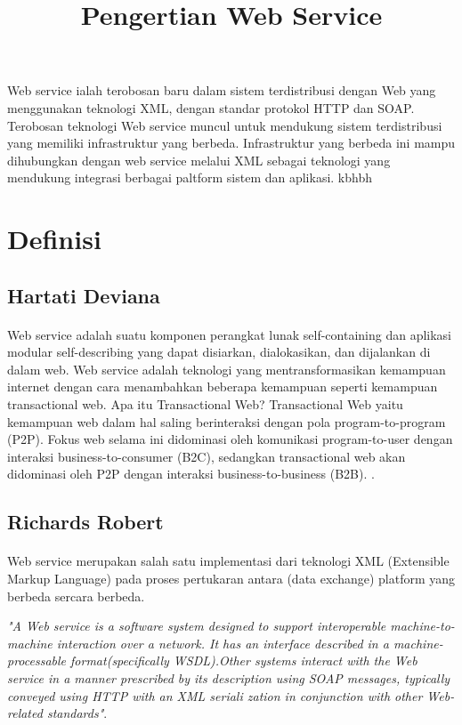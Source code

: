 \documentclass[12pt]{article}
\begin{document}
\title{Pengertian Web Service}
\maketitle

Web service ialah terobosan baru dalam sistem terdistribusi dengan Web yang menggunakan teknologi XML, dengan standar protokol  HTTP dan SOAP. Terobosan teknologi Web service muncul untuk mendukung sistem terdistribusi yang memiliki infrastruktur yang berbeda. Infrastruktur yang berbeda ini mampu dihubungkan dengan web service melalui XML sebagai teknologi yang mendukung integrasi berbagai paltform sistem dan aplikasi.
kbhbh
\section{Definisi}

\subsection{Hartati Deviana}
\paragraph{}
Web service adalah suatu komponen perangkat lunak self-containing dan aplikasi modular self-describing yang dapat disiarkan, dialokasikan, dan dijalankan di dalam web. Web service adalah teknologi yang mentransformasikan kemampuan internet dengan cara menambahkan beberapa kemampuan seperti kemampuan transactional web. Apa itu Transactional Web? Transactional Web yaitu kemampuan web dalam hal saling berinteraksi dengan pola program-to-program (P2P). Fokus web selama ini didominasi oleh komunikasi program-to-user dengan interaksi business-to-consumer (B2C), sedangkan transactional web akan didominasi oleh P2P dengan interaksi business-to-business (B2B). \cite{deviana2013penerapan}.

\subsection{Richards Robert}
\paragraph{}
Web service merupakan salah satu implementasi dari teknologi XML (Extensible Markup Language) pada proses pertukaran antara (data exchange) platform yang berbeda sercara berbeda.

\textit{"A Web service is a software system designed to support interoperable machine-to-machine interaction over a network. It has an interface described in a machine-processable format(specifically WSDL).Other systems interact with the Web service in a manner prescribed by its description using SOAP messages, typically conveyed using HTTP with an XML seriali zation in conjunction with other Web-related standards"}.
\end{document}
